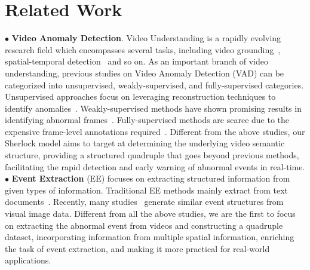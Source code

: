 \section{Related Work}

$\bullet$ \textbf{Video Anomaly Detection}. Video Understanding is a rapidly evolving research field which encompasses several tasks, including video grounding~\cite{wu2023uniref++,videogrounding_dino,lin2023collaborative}, spatial-temporal detection~\cite{GirdharCDZ19} and so on. As an important branch of video understanding, previous studies on Video Anomaly Detection (VAD) can be categorized into unsupervised, weakly-supervised, and fully-supervised categories. Unsupervised approaches focus on leveraging reconstruction techniques to identify anomalies~\cite{1,wujiandu2,wujiandu3,wujiandu4}. Weakly-supervised methods have shown promising results in identifying abnormal frames~\cite{ruojiandu2,ruojiandu3,ruojiandu4,ruojiandu5,ruojiandu6}. Fully-supervised methods are scarce due to the expensive frame-level annotations required~\cite{tab41,tab42,tab43,tab44,tab45,holmes-vad,cuva}. Different from the above studies, our Sherlock model aims to target at determining the underlying video semantic structure, providing a structured quadruple that goes beyond previous methods, facilitating the rapid detection and early warning of abnormal events in real-time.\\
$\bullet$ \textbf{Event Extraction} (EE) focuses on extracting structured information from given types of information. 
Traditional EE methods mainly extract from text documents~\cite{eetext1,eetext2,eetext3,eetext4,eetext5}.
Recently, many studies~\cite{mee1,mee2,mee3,mee4,mee5} generate similar event structures from visual image data. Different from all the above studies, we are the first to focus on extracting the abnormal event from videos and constructing a quadruple dataset, incorporating information from multiple spatial information, enriching the task of event extraction, and making it more practical for real-world applications.\\
